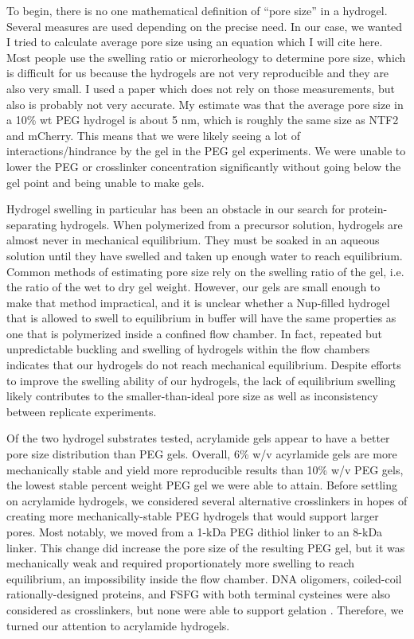 To begin, there is no one mathematical definition of ``pore size'' in a hydrogel.  Several measures are used depending on the precise need.  In our case, we wanted  I tried to calculate average pore size using an equation which I will cite here.  Most people use the swelling ratio or microrheology to determine pore size, which is difficult for us because the hydrogels are not very reproducible and they are also very small.  I used a paper which does not rely on those measurements, but also is probably not very accurate.  My estimate was that the average pore size in a 10\% wt PEG hydrogel is about 5 nm, which is roughly the same size as NTF2 and mCherry.  This means that we were likely seeing a lot of interactions/hindrance by the gel in the PEG gel experiments.  We were unable to lower the PEG or crosslinker concentration significantly without going below the gel point and being unable to make gels.

Hydrogel swelling in particular has been an obstacle in our search for protein-separating hydrogels.  When polymerized from a precursor solution, hydrogels are almost never in mechanical equilibrium.  They must be soaked in an aqueous solution until they have swelled and taken up enough water to reach equilibrium.  Common methods of estimating pore size rely on the swelling ratio of the gel, i.e. the ratio of the wet to dry gel weight.  However, our gels are small enough to make that method impractical, and it is unclear whether a Nup-filled hydrogel that is allowed to swell to equilibrium in buffer will have the same properties as one that is polymerized inside a confined flow chamber.  In fact, repeated but unpredictable buckling and swelling of hydrogels within the flow chambers indicates that our hydrogels do not reach mechanical equilibrium.  Despite efforts to improve the swelling ability of our hydrogels, the lack of equilibrium swelling likely contributes to the smaller-than-ideal pore size as well as inconsistency between replicate experiments.

Of the two hydrogel substrates tested, acrylamide gels appear to have a better pore size distribution than PEG gels.  Overall, 6\% w/v acyrlamide gels are more mechanically stable and yield more reproducible results than 10\% w/v PEG gels, the lowest stable percent weight PEG gel we were able to attain. Before settling on acrylamide hydrogels, we considered several alternative crosslinkers in hopes of creating more mechanically-stable PEG hydrogels that would support larger pores.  Most notably, we moved from a 1-kDa PEG dithiol linker to an 8-kDa linker.  This change did increase the pore size of the resulting PEG gel, but it was mechanically weak and required proportionately more swelling to reach equilibrium, an impossibility inside the flow chamber.  DNA oligomers, coiled-coil rationally-designed proteins, and FSFG with both terminal cysteines were also considered as crosslinkers, but none were able to support gelation \cite{brunette15,huang14}.  Therefore, we turned our attention to acrylamide hydrogels.

